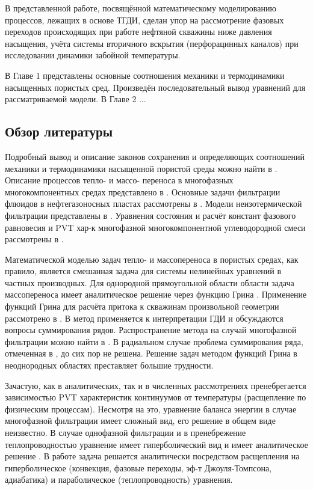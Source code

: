 	В представленной работе, посвящённой математическому моделированию процессов, лежащих в основе ТГДИ, сделан упор на рассмотрение фазовых переходов происходящих при работе нефтяной скважины ниже давления насыщения, учёта системы вторичного вскрытия (перфорацинных каналов) при исследовании динамики забойной температуры.
	
	В Главе 1 представлены основные соотношения механики и термодинамики насыщенных пористых сред. Произведён последовательный вывод уравнений для рассматриваемой модели.
	В Главе 2 ...

\subsection*{Обзор литературы}
	Подробный вывод и описание законов сохранения и определяющих соотношений механики и термодинамики насыщенной пористой среды можно найти в \cite{kondaurov}.
	Описание процессов тепло- и массо- переноса в многофазных многокомпонентных средах представлено в \cite{nigmatulin, multiphase}. 
	Основные задачи фильтрации флюидов в нефтегазоносных пластах рассмотрены в \cite{basniev, charniy}.
	Модели неизотермической фильтрации представлены в \cite{checkalyuk, alishaev}.
	Уравнения состояния и расчёт констант фазового равновесия и PVT хар-к многофазной многокомпонентной углеводородной смеси рассмотрены в \cite{brusilovskiy}.

	Математической моделью задач тепло- и массопереноса в пористых средах, как правило, является смешанная задача для системы нелинейных уравнений в частных производных. Для однородной прямоугольной области области задача массопереноса имеет аналитическое решение через функцию Грина \cite{vladimirov}.
	Применение функций Грина для расчёта притока к скважинам произвольной геометрии рассмотрено в \cite{aziz_green}.
	В \cite{posv1} метод применяется к интерпретации ГДИ и обсуждаются вопросы суммирования рядов.
	Распространение метода на случай многофазной фильтрации можно найти в \cite{posv2}.
	В радиальном случае проблема суммирования ряда, отмеченная в \cite{charniy}, до сих пор не решена.
	Решение задач методом функций Грина в неоднородных областях преставляет большие трудности.

	Зачастую, как в аналитических, так и в численных рассмотрениях пренебрегается зависимостью PVT характеристик континуумов от температуры (расщепление по физическим процессам). Несмотря на это, уравнение баланса энергии в случае многофазной фильтрации имеет сложный вид, его решение в общем виде неизвестно.
	В случае однофазной фильтрации и в пренебрежение теплопроводностью уравнение имеет гиперболический вид и имеет аналитическое решение \cite{checkalyuk,ramazanov_spe}.
	В работе \cite{duru} задача решается аналитически посредством расщепления на гиперболическое (конвекция, фазовые переходы, эф-т Джоуля-Томпсона, адиабатика) и параболическое (теплопроводность) уравнения.

